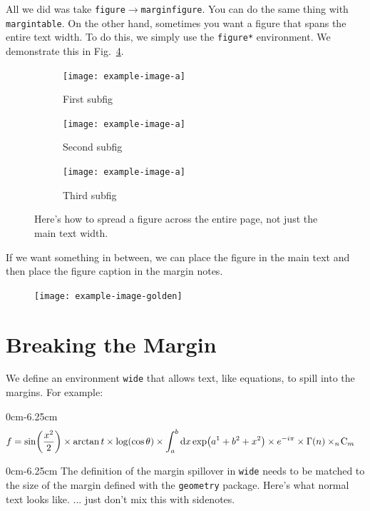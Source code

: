 \documentclass[12pt, oneside]{report}    %
\newenvironment{wide}{\begin{adjustwidth}{0cm}{-6.25cm}}{\end{adjustwidth}}
\begin{document}
All we did was take \texttt{figure}$\rightarrow$\texttt{marginfigure}. You can do the same thing with \texttt{margintable}. On the other hand, sometimes you want a figure that spans the entire text width. To do this, we simply use the \texttt{figure*} environment. We demonstrate this in Fig.~\ref{fig:subfigure:example:lec}.
\begin{figure}%
    \centering
    \begin{subfigure}{0.3\linewidth}
    \centering
        \texttt{[image: example-image-a]}
        \caption{First subfig}
        \label{fig:subfig:1:lec}
    \end{subfigure}\;%
    \begin{subfigure}{0.3\linewidth}
    \centering
        \texttt{[image: example-image-a]}
        \caption{Second subfig}
        \label{fig:subfig:2:lec}
    \end{subfigure}\;%
    \begin{subfigure}{0.3\linewidth}
    \centering
        \texttt{[image: example-image-a]}
        \caption{Third subfig}
        \label{fig:subfig:3:lec}
    \end{subfigure}%
    \caption{Here's how to spread a figure across the entire page, not just the main text width. \lipsum[1]}
    \label{fig:subfigure:example:lec}
\end{figure}

If we want something in between, we can place the figure in the main text and then place the figure caption in the margin notes. 
\begin{figure}%
    \texttt{[image: example-image-golden]}
    \label{fig:figure:example:golden:sidecap}
\end{figure}


\section{Breaking the Margin}


We define an environment \texttt{wide} that allows text, like equations, to spill into the margins. For example:
\begin{wide}
\begin{align}
f &= \sin\mleft(\frac{x^2}{2}\mright)
\times \arctan t 
\times \log \mleft(\cos \theta\mright)
\times \int_a^b \D{}x \exp\mleft(a^1 + b^2 + x^2\mright)
\times e^{-i\pi} 
\times \Gamma(n) 
\times _{n\!}\text{C}_m
\end{align}
\end{wide}
\begin{wide}
The definition of the margin spillover in \texttt{wide} needs to be matched to the size of the margin defined with the \texttt{geometry} package.
Here's what normal text looks like.  \lipsum[2]
... just don't mix this with sidenotes. 
\end{wide}
\end{document}
